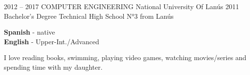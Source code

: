 \documentclass[9pt]{developercv} %
\begin{document}

\begin{entrylist}
	\entry
		{2012 -- 2017}
		{COMPUTER ENGINEERING}
		{National University Of Lanús}
		{}
	\entry
		{2011}
		{Bachelor’s Degree}
		{Technical High School N°3 from Lanús}
		{}
\end{entrylist}


\begin{minipage}[t]{0.3\textwidth}
	\vspace{-\baselineskip} %

	
	\textbf{Spanish} - native\\
	\textbf{English} - Upper-Int./Advanced\\
\end{minipage}
\hfill
\begin{minipage}[t]{0.3\textwidth}
	\vspace{-\baselineskip} %
	
	
	I love reading books, swimming, playing video games, watching movies/series and spending time with my daughter.
\end{minipage}
\hfill
\begin{minipage}[t]{0.3\textwidth}
	\vspace{-\baselineskip} %
	
	
\end{minipage}

\end{document}
